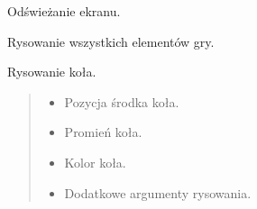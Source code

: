\documentclass[letterpaper,10pt,polish]{sphinxmanual}
\begin{document}
\begin{fulllineitems}

\begin{fulllineitems}
\label{\detokenize{main:main.Main.display_update}}
\pysigstartsignatures
{}
\pysigstopsignatures
\sphinxAtStartPar
Odświeżanie ekranu.

\end{fulllineitems}


\begin{fulllineitems}
\label{\detokenize{main:main.Main.draw}}
\pysigstartsignatures
{}
\pysigstopsignatures
\sphinxAtStartPar
Rysowanie wszystkich elementów gry.

\end{fulllineitems}


\begin{fulllineitems}
\label{\detokenize{main:main.Main.draw_circle}}
\pysigstartsignatures
{}
\pysigstopsignatures
\sphinxAtStartPar
Rysowanie koła.
\begin{quote}\begin{description}
\begin{itemize}
\item {} 
\sphinxAtStartPar
{} \textendash{} Pozycja środka koła.

\item {} 
\sphinxAtStartPar
{} \textendash{} Promień koła.

\item {} 
\sphinxAtStartPar
{} \textendash{} Kolor koła.

\item {} 
\sphinxAtStartPar
{} \textendash{} Dodatkowe argumenty rysowania.


\end{itemize}
\end{description}
\end{quote}
\end{fulllineitems}
\end{fulllineitems}
\end{document}
